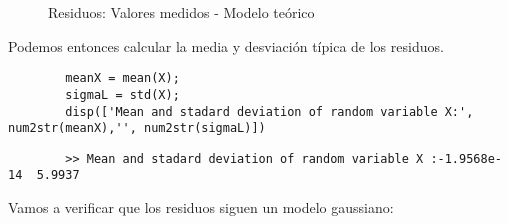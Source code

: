 \documentclass{article}
\begin{document}
    \begin{figure}[h]
        \centering
         \begin{subfigure}
                 \texttt{[image: figures\_outputs/B3/residuos.eps]}
         \end{subfigure}
         \begin{subfigure}
                \texttt{[image: figures\_outputs/B3/resuidos\_un.eps]} 
         \end{subfigure}
        \caption{Residuos: Valores medidos - Modelo teórico}
        \label{fig:my_label}
    \end{figure}
    \par Podemos entonces calcular la media y desviación típica de los residuos.
    \begin{lstlisting}
        meanX = mean(X);
        sigmaL = std(X);
        disp(['Mean and stadard deviation of random variable X:', num2str(meanX),'', num2str(sigmaL)])
    \end{lstlisting}
    \begin{verbatim}
        >> Mean and stadard deviation of random variable X :-1.9568e-14  5.9937
    \end{verbatim}
    \par Vamos a verificar que los residuos siguen un modelo gaussiano:
\end{document}

